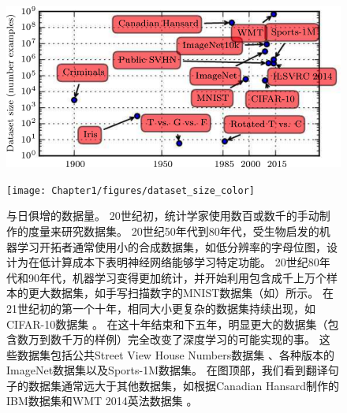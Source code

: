 \begin{figure}[!htb]
\ifOpenSource
\centerline{\includegraphics[scale=0.5]{images/8.png}}
\else
\centerline{\texttt{[image: Chapter1/figures/dataset\_size\_color]}}
\fi
\caption{与日俱增的数据量。
20世纪初，统计学家使用数百或数千的手动制作的度量来研究数据集\citep{garson:1900,student08ttest,anderson_irises_1935,Fisher-1936}。
20世纪50年代到80年代，受生物启发的机器学习开拓者通常使用小的合成数据集，如低分辨率的字母位图，设计为在低计算成本下表明神经网络能够学习特定功能\citep{Widrow60,Rumelhart86c}。
20世纪80年代和90年代，机器学习变得更加统计，并开始利用包含成千上万个样本的更大数据集，如手写扫描数字的MNIST数据集（如）所示\citep{LeCun98-small}。
在21世纪初的第一个十年，相同大小更复杂的数据集持续出现，如CIFAR-10数据集\citep{KrizhevskyHinton2009} 。
在这十年结束和下五年，明显更大的数据集（包含数万到数千万的样例）完全改变了深度学习的可能实现的事。
这些数据集包括公共Street View House Numbers数据集 \citep{netzer_reading_2011}、各种版本的ImageNet数据集\citep{imagenet_cvpr09,deng_what_2010,Russakovsky2014imagenet}以及Sports-1M数据集\citep{karpathy_large-scale_2014}。
在图顶部，我们看到翻译句子的数据集通常远大于其他数据集，如根据Canadian Hansard制作的IBM数据集\citep{brown1990statistical}和WMT 2014英法数据集\citep{schwenk2014wmt} 。
}
\label{fig:chap1_dataset_size_color}
\end{figure}
